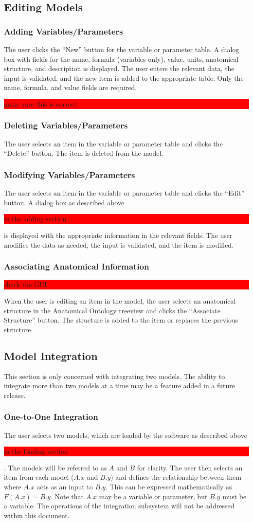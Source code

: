 \documentclass{article}
\newcommand{\todo}[1]{\colorbox{red}{\begin{minipage}{\textwidth}{#1}\end{minipage}}}
\begin{document}
\subsection{Editing Models}
\subsubsection{Adding Variables/Parameters}
The user clicks the ``New'' button for the variable or parameter table. A dialog box with fields for the name, formula (variables only), value, units, anatomical structure, and description is displayed. The user enters the relevant data, the input is validated, and the new item is added to the appropriate table. Only the name, formula, and value fields are required.
\todo{make sure this is correct}
\subsubsection{Deleting Variables/Parameters}
The user selects an item in the variable or parameter table and clicks the ``Delete'' button. The item is deleted from the model.
\subsubsection{Modifying Variables/Parameters}
The user selects an item in the variable or parameter table and clicks the ``Edit'' button. A dialog box as described above \todo{in the adding section} is displayed with the appropriate information in the relevant fields. The user modifies the data as needed, the input is validated, and the item is modified.
\subsubsection{Associating Anatomical Information}
\todo{check the GUI}
When the user is editing an item in the model, the user selects an anatomical structure in the Anatomical Ontology treeview and clicks the ``Associate Structure'' button. The structure is added to the item or replaces the previous structure.
\subsection{Model Integration}
This section is only concerned with integrating two models. The ability to integrate more than two models at a time may be a feature added in a future release.
\subsubsection{One-to-One Integration}
The user selects two models, which are loaded by the software as described above \todo{in the loading section}. The models will be referred to as $A$ and $B$ for clarity. The user then selects an item from each model ($A.x$ and $B.y$) and defines the relationship between them where $A.x$ acts as an input to $B.y$. This can be expressed mathematically as $F(A.x) = B.y$. Note that $A.x$ may be a variable or parameter, but $B.y$ must be a variable. The operations of the integration subsystem will not be addressed within this document.
\end{document}
